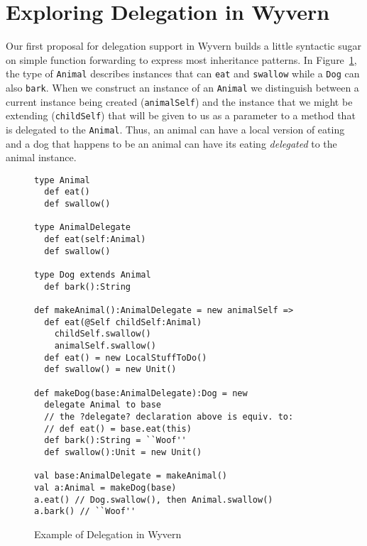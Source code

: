 \documentclass[preprint,10pt]{sigplanconf}
\begin{document}

\section{Exploring Delegation in Wyvern}

Our first proposal for delegation support in Wyvern builds a little syntactic sugar on simple function forwarding to express most inheritance patterns.  In Figure~\ref{f:wyvern-delegation}, the type of \texttt{Animal} describes instances that can \texttt{eat} and \texttt{swallow} while a \texttt{Dog} can also \texttt{bark}. When we construct an instance of an \texttt{Animal} we distinguish between a current instance being created (\texttt{animalSelf}) and the instance that we might be extending (\texttt{childSelf}) that will be given to us as a parameter to a method that is delegated to the \texttt{Animal}. Thus, an animal can have a local version of eating and a dog that happens to be an animal can have its eating \textit{delegated} to the animal instance.

\begin{figure}
\begin{lstlisting}
type Animal
  def eat()
  def swallow()

type AnimalDelegate
  def eat(self:Animal)
  def swallow()

type Dog extends Animal
  def bark():String

def makeAnimal():AnimalDelegate = new animalSelf =>
  def eat(@Self childSelf:Animal)
    childSelf.swallow()
    animalSelf.swallow()
  def eat() = new LocalStuffToDo()
  def swallow() = new Unit()

def makeDog(base:AnimalDelegate):Dog = new
  delegate Animal to base
  // the ?delegate? declaration above is equiv. to:
  // def eat() = base.eat(this)
  def bark():String = ``Woof''
  def swallow():Unit = new Unit()

val base:AnimalDelegate = makeAnimal()
val a:Animal = makeDog(base)
a.eat() // Dog.swallow(), then Animal.swallow()
a.bark() // ``Woof''
\end{lstlisting}
\caption{Example of Delegation in Wyvern}
\label{f:wyvern-delegation}
\end{figure}
\end{document}
